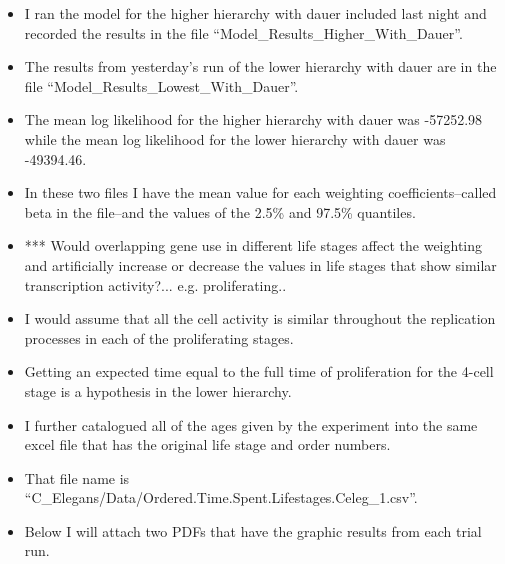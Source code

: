 \documentclass[letterpaper,index=totoc,hyperref,openany]{labbook} %
\begin{document}
\begin{itemize}
\item I ran the model for the higher hierarchy with dauer included last night and recorded the results in the file \enquote{Model\_Results\_Higher\_With\_Dauer}.
\item The results from yesterday's run of the lower hierarchy with dauer are in the file \enquote{Model\_Results\_Lowest\_With\_Dauer}.
\item The mean log likelihood for the higher hierarchy with dauer was -57252.98 while the mean log likelihood for the lower hierarchy with dauer was -49394.46.
\item In these two files I have the mean value for each weighting coefficients--called beta in the file--and the values of the 2.5\% and 97.5\% quantiles.
\item *** Would overlapping gene use in different life stages affect the weighting and artificially increase or decrease the values in life stages that show similar transcription activity?... e.g. proliferating.. 
\item I would assume that all the cell activity is similar throughout the replication processes in each of the proliferating stages. 
\item Getting an expected time equal to the full time of proliferation for the 4-cell stage is a hypothesis in the lower hierarchy.
\item I further catalogued all of the ages given by the experiment into the same excel file that has the original life stage and order numbers.
\item That file name is \enquote{C\_Elegans/Data/Ordered.Time.Spent.Lifestages.Celeg\_1.csv}.
\item Below I will attach two PDFs that have the graphic results from each trial run.
\end{itemize}
\end{document}
